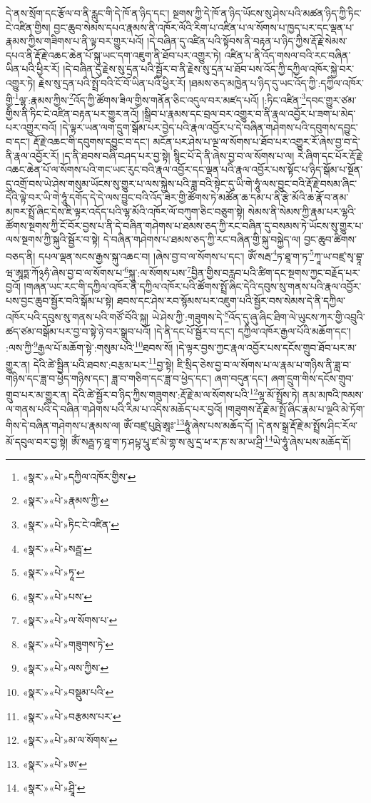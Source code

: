 དེ་ནས་སྲོག་དང་རྩོལ་བ་ནི་རླུང་གི་དེ་ཁོ་ན་ཉིད་དང་། སྔགས་ཀྱི་དེ་ཁོ་ན་ཉིད་ཡོངས་སུ་ཤེས་པའི་མཚན་ཉིད་ཀྱི་ཏིང་ངེ་འཛིན་གྱིས། བྱང་ཆུབ་སེམས་དཔའ་རྣམས་ནི་འཁོར་ལོའི་རིག་པ་འཛིན་པ་ལ་སོགས་པ་ཁྱད་པར་དང་ལྡན་པ་རྣམས་ཀྱིས་གཟིགས་པ་ནི་ལྟ་བར་གྱུར་པའོ། །དེ་བཞིན་དུ་འཛིན་པའི་སྟོབས་ནི་བརྟན་པ་ཉིད་ཀྱིས་རྡོ་རྗེ་སེམས་དཔའ་ནི་རྡོ་རྗེ་འཆང་ཆེན་པོ་སྐུ་ཡང་དག་འཇུག་ནི་ཐོབ་པར་འགྱུར་ཏེ། འཛིན་པ་ནི་འོད་གསལ་བའི་རང་བཞིན་ཡིན་པའི་ཕྱིར་རོ། །དེ་བཞིན་དུ་རྗེས་སུ་དྲན་པའི་སྦྱོར་བ་ནི་རྗེས་སུ་དྲན་པ་ཐོབ་པས་འོད་ཀྱི་དཀྱིལ་འཁོར་སྐྱེ་བར་འགྱུར་ཏེ། རྗེས་སུ་དྲན་པའི་སྤྲོ་བའི་ངོ་བོ་ཡིན་པའི་ཕྱིར་རོ། །ཐམས་ཅད་མཁྱེན་པ་ཉིད་དུ་ཡང་འོད་ཀྱི་:དཀྱིལ་འཁོར་གྱི་\footnote{«སྣར་»«པེ་»དཀྱིལ་འཁོར་གྱིས་}ལྷ་:རྣམས་ཀྱིས་\footnote{«སྣར་»«པེ་»རྣམས་ཀྱི་}འོད་ཀྱི་ཚོགས་ཟིལ་གྱིས་གནོན་ཅིང་འདུལ་བར་མཛད་པའོ། །:ཏིང་འཛིན་\footnote{«སྣར་»«པེ་»ཏིང་ངེ་འཛིན་}དབང་གྱུར་ཙམ་གྱིས་ནི་ཏིང་ངེ་འཛིན་བརྟན་པར་གྱུར་ནའོ། །སྒྲིབ་པ་རྣམས་དང་བྲལ་བར་འགྱུར་བ་ནི་རྣལ་འབྱོར་པ་ཟག་པ་མེད་པར་འགྱུར་བའོ། །དེ་ལྟར་ཡན་ལག་དྲུག་སྒོམ་པར་བྱེད་པའི་རྣལ་འབྱོར་པ་དེ་བཞིན་གཤེགས་པའི་དབུགས་དབྱུང་བ་དང་། རྡོ་རྗེ་འཆང་གི་དབུགས་དབྱུང་བ་དང་། མངོན་པར་ཤེས་པ་ལྔ་ལ་སོགས་པ་ཐོབ་པར་འགྱུར་རོ་ཞེས་བྱ་བ་དེ་ནི་རྣལ་འབྱོར་རོ། །ད་ནི་ཐབས་བཞི་བཤད་པར་བྱ་སྟེ། སྙིང་པོ་དེ་ནི་ཞེས་བྱ་བ་ལ་སོགས་པ་ལ། རེ་ཞིག་དང་པོར་རྡོ་རྗེ་འཆང་ཆེན་པོ་ལ་སོགས་པའི་གང་ཡང་རུང་བའི་རྣལ་འབྱོར་དང་ལྡན་པའི་རྣལ་འབྱོར་པས་སྟོང་པ་ཉིད་སྒོམ་པ་སྔོན་དུ་འགྲོ་བས་ཡེ་ཤེས་གསུམ་ཡོངས་སུ་གྱུར་པ་ལས་སྐྱེས་པའི་ཟླ་བའི་སྟེང་དུ་ཡི་གེ་ཧཱུཾ་ལས་བྱུང་བའི་རྡོ་རྗེ་བསམ་ཞིང་དེའི་ལྟེ་བར་ཡི་གེ་ཧཱུཾ་དགོད་དེ་དེ་ལས་བྱུང་བའི་འོད་ཟེར་གྱི་ཚོགས་ཏེ་མཚོན་ཆ་དམ་པ་ནི་རྩེ་མོའི་ཆ་རྣོ་བ་ནམ་མཁར་སྤྲོ་ཞིང་དེས་ཇི་ལྟར་འདོད་པའི་ལྷ་མོའི་འཁོར་ལོ་བཀུག་ཅིང་བཅུག་སྟེ། སེམས་ནི་སེམས་ཀྱི་རྣམ་པར་ལྷའི་ཚོགས་སྔགས་ཀྱི་ངོ་བོར་བྱས་པ་ནི་དེ་བཞིན་གཤེགས་པ་ཐམས་ཅད་ཀྱི་རང་བཞིན་དུ་བསམས་ཏེ་ཡོངས་སུ་གྱུར་པ་ལས་སྔགས་ཀྱི་སྐུའི་སྦྱོར་བ་སྟེ། དེ་བཞིན་གཤེགས་པ་ཐམས་ཅད་ཀྱི་རང་བཞིན་གྱི་སྐུ་བསྐྱེད་ལ། བྱང་ཆུབ་ཚིགས་བཅད་ནི། དཔལ་ལྡན་སངས་རྒྱས་སྐུ་འཆང་བ། །ཞེས་བྱ་བ་ལ་སོགས་པ་དང་། ཨོཾ་སརྦ་\footnote{«སྣར་»«པེ་»སརྦྦ་}ཏ་ཐཱ་ག་ཏ་\footnote{«སྣར་»«པེ་»ཏཱ་}ཀཱ་ཡ་བཛྲ་སྭ་བྷཱ་ཝ་ཨཱཏྨ་ཀོ྅ཧཾ་ཞེས་བྱ་བ་ལ་སོགས་པ་\footnote{«སྣར་»«པེ་»པས་}སྐུ་:ལ་སོགས་པས་\footnote{«སྣར་»«པེ་»ལ་སོགས་པ་}བྱིན་གྱིས་བརླབ་པའི་ཚིག་དང་སྔགས་ཀྱང་བརྗོད་པར་བྱའོ། །གཞན་ཡང་རང་གི་དཀྱིལ་འཁོར་ནི་དཀྱིལ་འཁོར་པའི་ཚོགས་སྤྲོ་ཞིང་དེའི་དབུས་སུ་གནས་པའི་རྣལ་འབྱོར་པས་བྱང་ཆུབ་སྦྱོར་བའི་སྒོམ་པ་སྟེ། ཐབས་དང་ཤེས་རབ་སྙོམས་པར་འཇུག་པའི་སྦྱོར་བས་སེམས་དེ་ནི་དཀྱིལ་འཁོར་པའི་དབུས་སུ་གནས་པའི་གཙོ་བོའི་སྐུ། ཡེ་ཤེས་ཀྱི་:གཟུགས་དེ་\footnote{«སྣར་»«པེ་»གཟུགས་ཏེ་}འོད་དུ་ཞུ་ཞིང་ཐིག་ལེ་ཡུངས་ཀར་གྱི་འབྲུའི་ཚད་ཙམ་བསྒོམ་པར་བྱ་བ་སྟེ་ཉེ་བར་སྒྲུབ་པའོ། །དེ་ནི་དང་པོ་སྦྱོར་བ་དང་། དཀྱིལ་འཁོར་རྒྱལ་པོའི་མཆོག་དང་། :ལས་ཀྱི་\footnote{«སྣར་»«པེ་»ལས་ཀྱིས་}རྒྱལ་པོ་མཆོག་སྟེ་:གསུམ་པའི་\footnote{«སྣར་»«པེ་»བསྡུམ་པའི་}ཐབས་སོ། །དེ་ལྟར་བྱས་ཀྱང་རྣལ་འབྱོར་པས་དངོས་གྲུབ་ཐོབ་པར་མ་གྱུར་ན། དེའི་ཚེ་སྦྱིན་པའི་ཐབས་:བརྩམ་པར་\footnote{«སྣར་»«པེ་»བརྩམས་པར་}བྱ་སྟེ། ཇི་སྲིད་ཅེས་བྱ་བ་ལ་སོགས་པ་ལ་རྣམ་པ་གཉིས་ནི་ཟླ་བ་གཉིས་དང་ཟླ་བ་ཕྱེད་གཉིས་དང་། ཟླ་བ་གཅིག་དང་ཟླ་བ་ཕྱེད་དང་། ཞག་བདུན་དང་། ཞག་དྲུག་གིས་དངོས་གྲུབ་གྲུབ་པར་མ་གྱུར་ན། དེའི་ཚེ་སྦྱོར་བ་ཉིད་ཀྱིས་གཟུགས་:རྡོ་རྗེ་མ་ལ་སོགས་པའི་\footnote{«སྣར་»«པེ་»མ་ལ་སོགས་}ལྷ་མོ་སྤྲོས་ཏེ། ནམ་མཁའི་ཁམས་ལ་གནས་པའི་དེ་བཞིན་གཤེགས་པའི་རིམ་པ་འདིས་མཆོད་པར་བྱའོ། །གཟུགས་རྡོ་རྗེ་མ་སྤྲོ་ཞིང་རྣམ་པ་ལྔའི་མེ་ཏོག་གིས་དེ་བཞིན་གཤེགས་པ་རྣམས་ལ། ཨོཾ་བཛྲ་པུཥྤེ་ཨཱཿ་\footnote{«སྣར་»«པེ་»ཨ་}ཧཱུཾ་ཞེས་པས་མཆོད་དོ། །དེ་ནས་སྒྲ་རྡོ་རྗེ་མ་སྤྲོས་ཤིང་རོལ་མོ་དབུལ་བར་བྱ་སྟེ། ཨོཾ་སརྦྦ་ཏ་ཐཱ་ག་ཏ་ཤཔྟ་པཱུ་ཛ་མེ་གྷ་ས་མུ་དྲ་ཕ་ར་ཎ་ས་མ་ཡ་ཤྲི་\footnote{«སྣར་»«པེ་»ཤྲཱི་}ཡེ་ཧཱུཾ་ཞེས་པས་མཆོད་དོ། 